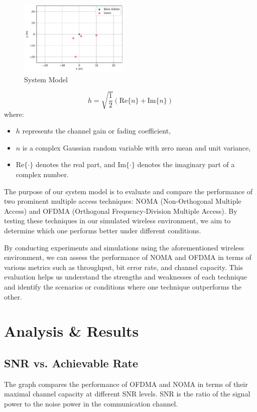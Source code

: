 \documentclass[conference]{IEEEtran}
\begin{document}
\begin{figure}[t!]
    \centering
    \includegraphics[width=0.47\textwidth, height= 0.35\textwidth]{figures/system_model.pdf}
    \caption{System Model}
\end{figure}

$$
h = \sqrt{\frac{1}{2}} \left( \text{Re}\{n\} + \text{Im}\{n\} \right)
$$
where:
\begin{itemize}
  \item $h$ represents the channel gain or fading coefficient,
  \item $n$ is a complex Gaussian random variable with zero mean and unit variance,
  \item $\text{Re}\{\cdot\}$ denotes the real part, and $\text{Im}\{\cdot\}$ denotes the imaginary part of a complex number.
\end{itemize}

The purpose of our system model is to evaluate and compare the performance of two prominent multiple access techniques: NOMA (Non-Orthogonal Multiple Access) and OFDMA (Orthogonal Frequency-Division Multiple Access). By testing these techniques in our simulated wireless environment, we aim to determine which one performs better under different conditions.

By conducting experiments and simulations using the aforementioned wireless environment, we can assess the performance of NOMA and OFDMA in terms of various metrics such as throughput, bit error rate, and channel capacity. This evaluation helps us understand the strengths and weaknesses of each technique and identify the scenarios or conditions where one technique outperforms the other.

\section{Analysis \& Results}

\subsection{SNR vs. Achievable Rate}
The graph compares the performance of OFDMA and NOMA in terms of their maximal channel capacity at different SNR levels. SNR is the ratio of the signal power to the noise power in the communication channel.
\end{document}

